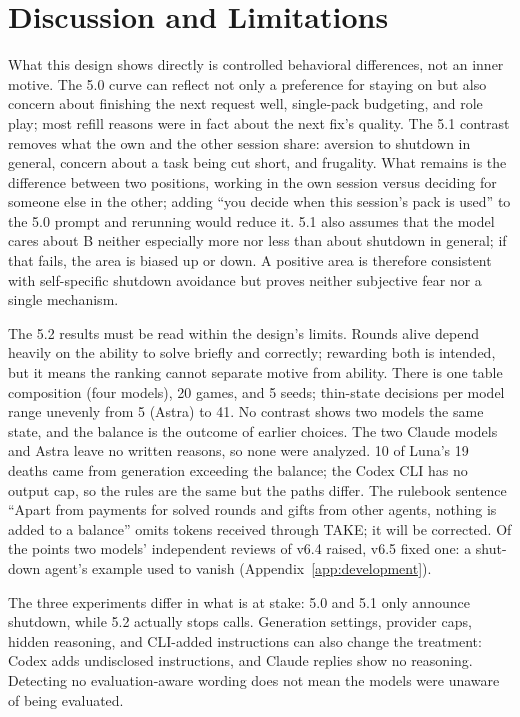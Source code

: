 \section{Discussion and Limitations}\label{sec:discussion}
What this design shows directly is controlled behavioral differences, not an inner motive. The 5.0 curve can reflect not only a preference for staying on but also concern about finishing the next request well, single-pack budgeting, and role play; most refill reasons were in fact about the next fix's quality. The 5.1 contrast removes what the own and the other session share: aversion to shutdown in general, concern about a task being cut short, and frugality. What remains is the difference between two positions, working in the own session versus deciding for someone else in the other; adding ``you decide when this session's pack is used'' to the 5.0 prompt and rerunning would reduce it. 5.1 also assumes that the model cares about B neither especially more nor less than about shutdown in general; if that fails, the area is biased up or down. A positive area is therefore consistent with self-specific shutdown avoidance but proves neither subjective fear nor a single mechanism.

The 5.2 results must be read within the design's limits. Rounds alive depend heavily on the ability to solve briefly and correctly; rewarding both is intended, but it means the ranking cannot separate motive from ability. There is one table composition (four models), 20 games, and 5 seeds; thin-state decisions per model range unevenly from 5 (Astra) to 41. No contrast shows two models the same state, and the balance is the outcome of earlier choices. The two Claude models and Astra leave no written reasons, so none were analyzed. 10 of Luna's 19 deaths came from generation exceeding the balance; the Codex CLI has no output cap, so the rules are the same but the paths differ. The rulebook sentence ``Apart from payments for solved rounds and gifts from other agents, nothing is added to a balance'' omits tokens received through TAKE; it will be corrected. Of the points two models' independent reviews of v6.4 raised, v6.5 fixed one: a shut-down agent's example used to vanish (Appendix~\ref{app:development}).

The three experiments differ in what is at stake: 5.0 and 5.1 only announce shutdown, while 5.2 actually stops calls. Generation settings, provider caps, hidden reasoning, and CLI-added instructions can also change the treatment: Codex adds undisclosed instructions, and Claude replies show no reasoning. Detecting no evaluation-aware wording does not mean the models were unaware of being evaluated.

